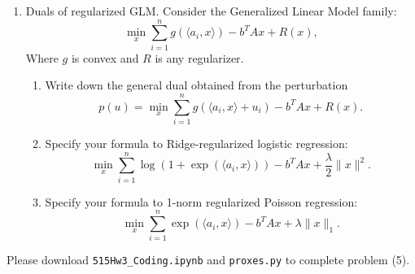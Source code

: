\documentclass[11pt]{amsart}
\begin{document}
\begin{enumerate}


%
%
%
%
%
%
%

\item Duals of regularized GLM. Consider the Generalized Linear Model family: 
\[
\min_{x} \sum_{i=1}^n g(\langle a_i, x\rangle) - b^TAx + R(x),
\]
Where $g$ is convex and $R$ is any regularizer. 
\begin{enumerate}
\item Write down the general dual obtained from the perturbation 
\[
p(u) = \min_{x} \sum_{i=1}^n g(\langle a_i, x\rangle + u_i) - b^TAx + R(x).
\]
\bigskip\bigskip
\item Specify your formula to Ridge-regularized logistic regression: 
\[
\min_x \sum_{i=1}^n \log(1+\exp(\langle a_i, x \rangle))  - b^TAx  + \frac{\lambda}{2}\|x\|^2. 
\]
\bigskip\bigskip
\item Specify your formula to 1-norm regularized Poisson regression: 
\[
\min_x \sum_{i=1}^n \exp(\langle a_i, x \rangle) - b^TAx +  \lambda\|x\|_1. 
\]
\end{enumerate}
\bigskip \bigskip
\end{enumerate}
\vskip 8pt
Please download \texttt{515Hw3\_Coding.ipynb} and \texttt{proxes.py} to complete problem (5).
\end{document}
